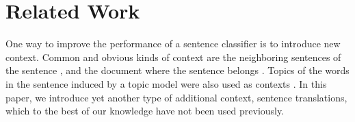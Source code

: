 \documentclass{article}
\begin{document}
\begin{comment}
\begin{table}[t]
	\scriptsize
	\centering
	\begin{tabular}{|c|cccc|}
		\hline
		Rank  & MR    & CR    & SUBJ  & TREC \\
		\hline
		1     & \textcolor[rgb]{1,0,0}{\textbf{FI}} & UK & IT    & \textcolor[rgb]{0,0,1}{\textbf{FR}} \\
		2     & UK & \textcolor[rgb]{1,0,0}{\textbf{FI}} & PL    & RU \\
		3     & IT    & KO    & AR    & MN \\
		4     & \textcolor[rgb]{0,0.5,0}{\textbf{NO}}    & PL    & \textcolor[rgb]{1,0,0}{\textbf{FI}} & PL \\
		5     & AR    & \textcolor[rgb]{0,0.5,0}{\textbf{NO}}    & \textcolor[rgb]{0,0,1}{\textbf{FR}} & \textcolor[rgb]{0,0.5,0}{\textbf{NO}} \\
		6     & RU & IT    & MN    & AR \\
		7     & KO    & RU & \textcolor[rgb]{0,0.5,0}{\textbf{NO}}    & UK \\
		8     & \textcolor[rgb]{0,0,1}{\textbf{FR}} & \textcolor[rgb]{0,0,1}{\textbf{FR}} & RU & KO \\
		9     & MN    & AR    & UK & \textcolor[rgb]{1,0,0}{\textbf{FI}} \\
		10    & PL    & MN    & KO    & IT \\
		\hline
	\end{tabular}\caption{Ranking of the accuracies of a language when used as an additional context for CNN+MCFA when $N=1$ on multiple datasets.}
	\label{tab:ranking}\end{table}\end{comment}

\section{Related Work}



One way to improve the performance of a sentence classifier is to introduce new context. Common and obvious kinds of context are the neighboring sentences of the sentence \cite{lin2015hierarchical}, and the document where the sentence belongs \cite{huang2012improving}. 
Topics of the words in the sentence induced by a topic model
were also used as contexts \cite{zhao2017topic}.
In this paper, we introduce yet another type of additional context, sentence translations, which to the best of our knowledge have not been used previously.
\end{document}
